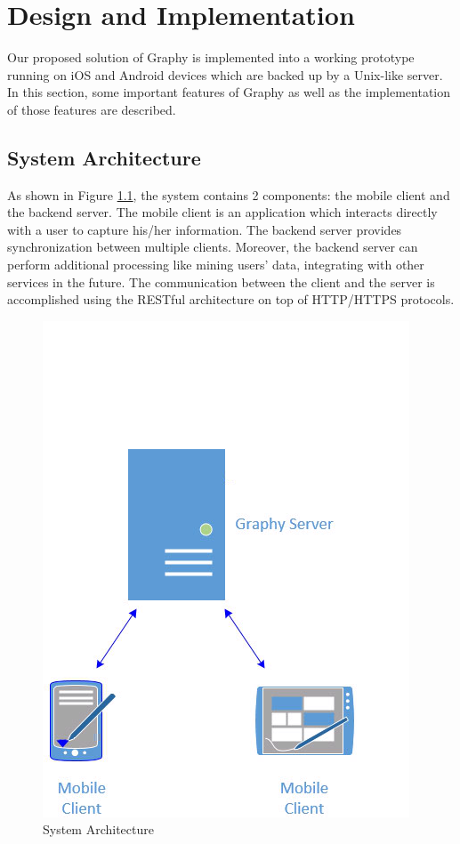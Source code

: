 \chapter{Design and Implementation}
\label{implementation}
Our proposed solution of Graphy is implemented into a working prototype running on iOS and Android devices which are backed up by a Unix-like server. In this section, some important features of Graphy as well as the implementation of those features are described.
\section{System Architecture}
As shown in Figure \ref{fg:architecture}, the system contains 2 components: the mobile client and the backend server. The mobile client is an application which interacts directly with a user to capture his/her information. The backend server provides synchronization between multiple clients. Moreover, the backend server can perform additional processing like mining users' data, integrating with other services in the future. The communication between the client and the server is accomplished using the RESTful architecture on top of HTTP/HTTPS protocols.

\begin{figure}[!h]
\begin{centering}
\includegraphics[scale=0.6]{pics/architecture}
\caption{System Architecture}\label{fg:architecture}
\end{centering}
\end{figure}

